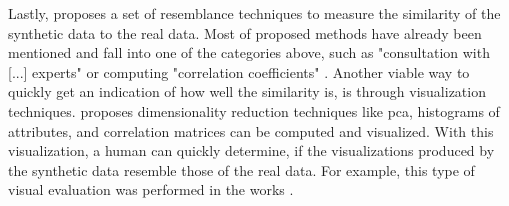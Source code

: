 Lastly, \cite{hernandez2022SyntheticDataGeneration} proposes a set of resemblance techniques to measure the similarity of the synthetic data to the real data.
Most of \cite{hernandez2022SyntheticDataGeneration} proposed methods have already been mentioned and fall into one of the categories above, such as "consultation with [...] experts" or computing "correlation coefficients" \cite{hernandez2022SyntheticDataGeneration}.
Another viable way to quickly get an indication of how well the similarity is, is through visualization techniques.
\cite{hernandez2022SyntheticDataGeneration} proposes dimensionality reduction techniques like \gls{pca}, histograms of attributes, and correlation matrices can be computed and visualized.
With this visualization, a human can quickly determine, if the visualizations produced by the synthetic data resemble those of the real data.
For example, this type of visual evaluation was performed in the works \cite{li2022TTSGANTransformerbasedTimeSeries, leminh2021AirGenGANbasedSynthetica, mckeever2020SynthesisingTabularDatasets}.


